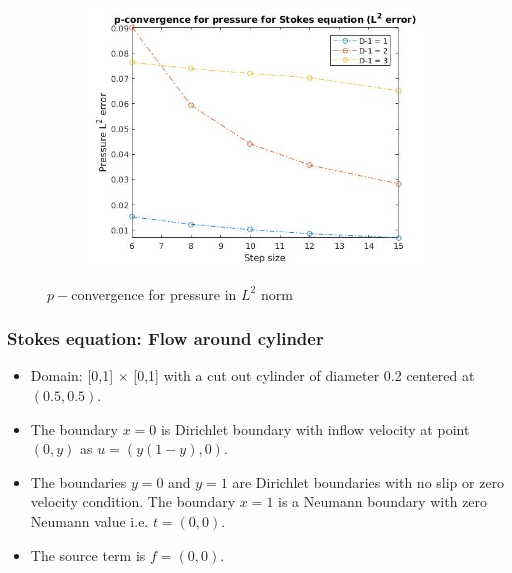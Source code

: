 \documentclass{beamer}
\begin{document}
\begin{frame}
\begin{figure}
\begin{subfigure}{0.9\textwidth}
\centering
  \includegraphics[width=0.9\linewidth]{p_conv_pressure_l2_stokes.jpg}
  \label{p_convergence_pressure_l2}
\end{subfigure}
\caption{$p-$convergence for pressure in $L^2$ norm}
\label{p_conv_stokes_flow}
\end{figure}
\end{frame}
\begin{frame}
\frametitle{Stokes equation: Flow around cylinder}
\begin{itemize}
\item Domain: [0,1] $\times$ [0,1] with a cut out cylinder of diameter 0.2 centered at $(0.5,0.5)$.
\item The boundary ${x=0}$ is Dirichlet boundary with inflow velocity at point $(0,y)$ as $u = (y(1-y), 0)$. 
\item The boundaries ${y = 0}$ and ${y = 1}$ are Dirichlet boundaries with no slip or zero velocity condition. The boundary ${x = 1}$ is a Neumann boundary with zero Neumann value i.e. $t = (0, 0)$. 
\item The source term is $f = (0, 0)$.
\end{itemize}
\end{frame}
\end{document}

